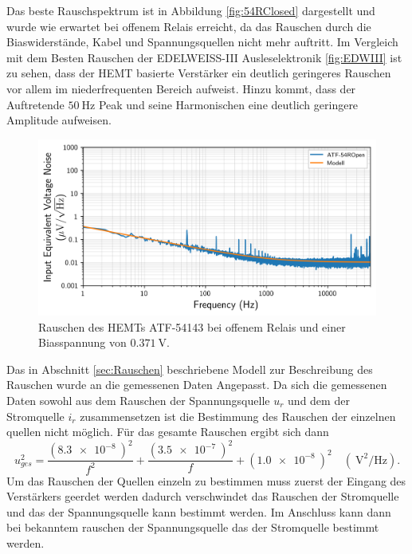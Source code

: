 Das beste Rauschspektrum ist in Abbildung \ref{fig:54RClosed} dargestellt und wurde wie erwartet bei offenem Relais erreicht, da das Rauschen durch die Biaswiderstände, Kabel und Spannungsquellen nicht mehr auftritt.
Im Vergleich mit dem Besten Rauschen der EDELWEISS-III Ausleselektronik \ref{fig:EDWIII} ist zu sehen, dass der HEMT basierte Verstärker ein deutlich geringeres Rauschen vor allem im niederfrequenten Bereich aufweist.
Hinzu kommt, dass der Auftretende $\SI{50}{\hertz}$ Peak und seine Harmonischen eine deutlich geringere Amplitude aufweisen.

\begin{figure}[!b]
\begin{center}
\includegraphics[width=\textwidth]{./fig/Rauschen/F54ROpen.png}
\vspace{-0.5cm}
\caption{Rauschen des HEMTs  ATF-54143 bei offenem Relais und einer Biasspannung von $\SI{0.371}{\volt}$.}
\label{fig:54ROpen}
\end{center}
\end{figure}

Das in Abschnitt \ref{sec:Rauschen} beschriebene Modell zur Beschreibung des Rauschen wurde an die gemessenen Daten Angepasst.
Da sich die gemessenen Daten sowohl aus dem Rauschen der Spannungsquelle $u_r$ und dem der Stromquelle $i_r$ zusammensetzen ist die Bestimmung des Rauschen der einzelnen quellen nicht möglich.
Für das gesamte Rauschen ergibt sich dann
\begin{equation}
u^2_{ges} = \frac{(\SI{8.3e-8}{})^2}{f^2} + \frac{(\SI{3.5e-7}{})^2}{f} + (\SI{1.0e-8}{})^2 \quad (\SI{}{\volt\squared\per\hertz}).
\end{equation}
Um das Rauschen der Quellen einzeln zu bestimmen muss zuerst der Eingang des Verstärkers geerdet werden dadurch verschwindet das Rauschen der Stromquelle und das der Spannungsquelle kann bestimmt werden.
Im Anschluss kann dann bei bekanntem rauschen der Spannungsquelle das der Stromquelle bestimmt werden.

